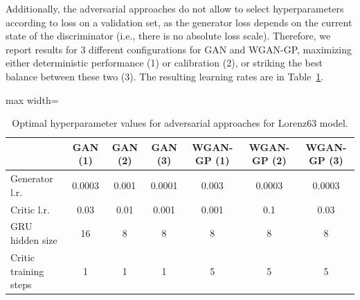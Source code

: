\documentclass[twoside,11pt]{article}
\begin{document}
	Additionally, the adversarial approaches do not allow to select hyperparameters according to loss on a validation set, as the generator loss depends on the current state of the discriminator (i.e., there is no absolute loss scale). Therefore, we report results for 3 different configurations for GAN and WGAN-GP, maximizing either deterministic performance (1) or calibration (2), or striking the best balance between these two (3). The resulting learning rates are in Table~\ref{tab:lr_lorenz63_GAN}.
	
	
	
	\begin{table}
		\begin{center}
			\begin{adjustbox}{max width=\textwidth}
				\begin{tabular}{lcccccc}
					\toprule
					& GAN (1) & GAN (2) & GAN (3) & WGAN-GP (1) & WGAN-GP (2) & WGAN-GP (3) \\
					\midrule
					Generator  l.r. & 0.0003 & 0.001 & 0.0001 & 0.003& 0.0003 & 0.0003 \\
					Critic l.r. & 0.03 & 0.01 & 0.001 & 0.001 &0.1&0.03 \\
					GRU hidden size & 16 & 8 & 8& 8 & 8 & 8 \\
					Critic training steps & 1 & 1& 1 & 5 & 5& 5 \\
					\bottomrule
				\end{tabular}
			\end{adjustbox}
		\end{center}
		\caption{Optimal hyperparameter values for adversarial approaches for Lorenz63 model.}
		\label{tab:lr_lorenz63_GAN}
	\end{table}
	
\end{document}
